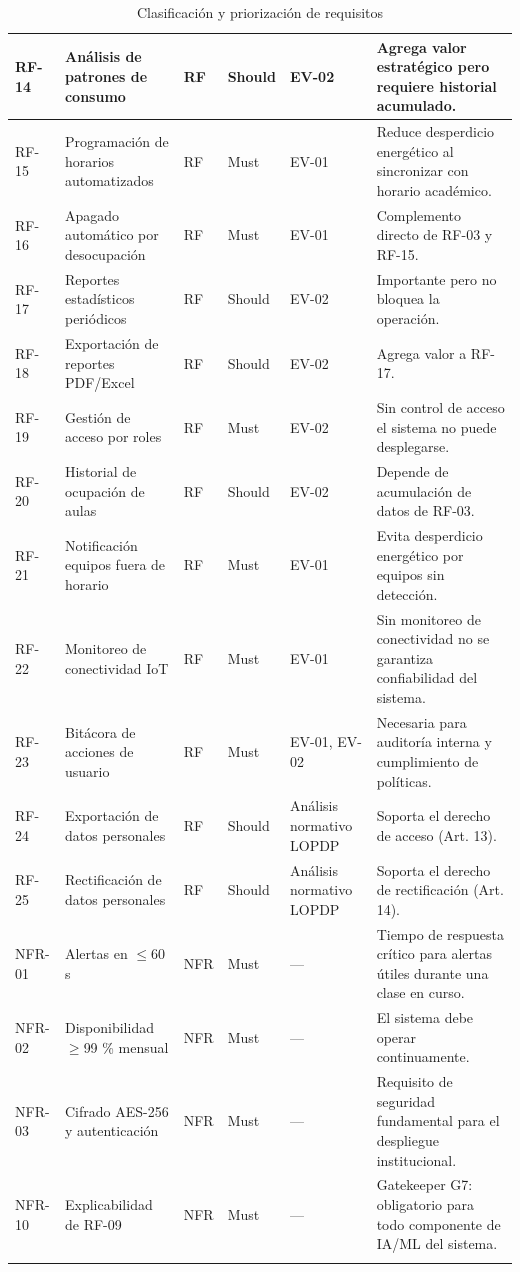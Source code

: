 \begin{longtable}{|p{2.6cm}|p{2.6cm}|p{2.6cm}|p{2.6cm}|p{2.6cm}|p{2.6cm}|}
RF-14 & Análisis de patrones de consumo & RF & Should & EV-02 & Agrega valor estratégico pero requiere historial acumulado. \\ \hline
RF-15 & Programación de horarios automatizados & RF & Must & EV-01 & Reduce desperdicio energético al sincronizar con horario académico. \\ \hline
RF-16 & Apagado automático por desocupación & RF & Must & EV-01 & Complemento directo de RF-03 y RF-15. \\ \hline
RF-17 & Reportes estadísticos periódicos & RF & Should & EV-02 & Importante pero no bloquea la operación. \\ \hline
RF-18 & Exportación de reportes PDF/Excel & RF & Should & EV-02 & Agrega valor a RF-17. \\ \hline
RF-19 & Gestión de acceso por roles & RF & Must & EV-02 & Sin control de acceso el sistema no puede desplegarse. \\ \hline
RF-20 & Historial de ocupación de aulas & RF & Should & EV-02 & Depende de acumulación de datos de RF-03. \\ \hline
RF-21 & Notificación equipos fuera de horario & RF & Must & EV-01 & Evita desperdicio energético por equipos sin detección. \\ \hline
RF-22 & Monitoreo de conectividad IoT & RF & Must & EV-01 & Sin monitoreo de conectividad no se garantiza confiabilidad del sistema. \\ \hline
RF-23 & Bitácora de acciones de usuario & RF & Must & EV-01, EV-02 & Necesaria para auditoría interna y cumplimiento de políticas. \\ \hline
RF-24 & Exportación de datos personales & RF & Should & Análisis normativo LOPDP & Soporta el derecho de acceso (Art. 13). \\ \hline
RF-25 & Rectificación de datos personales & RF & Should & Análisis normativo LOPDP & Soporta el derecho de rectificación (Art. 14). \\ \hline
NFR-01 & Alertas en $\leq$60 s & NFR & Must & --- & Tiempo de respuesta crítico para alertas útiles durante una clase en curso. \\ \hline
NFR-02 & Disponibilidad $\geq$99 \% mensual & NFR & Must & --- & El sistema debe operar continuamente. \\ \hline
NFR-03 & Cifrado AES-256 y autenticación & NFR & Must & --- & Requisito de seguridad fundamental para el despliegue institucional. \\ \hline
NFR-10 & Explicabilidad de RF-09 & NFR & Must & --- & Gatekeeper G7: obligatorio para todo componente de IA/ML del sistema. \\ \hline
\caption{Clasificación y priorización de requisitos}
\end{longtable}
\endgroup

